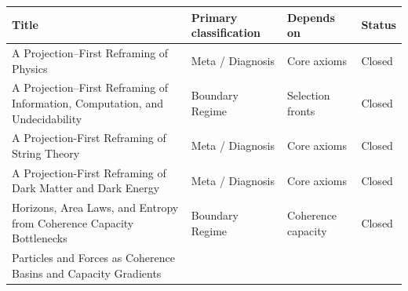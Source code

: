 \documentclass[11pt]{article}
\begin{document}
\begin{center}
\small
\begin{tabular}{|p{7.2cm}|p{3.6cm}|p{3.6cm}|p{1.6cm}|}
\hline
\textbf{Title} & \textbf{Primary classification} & \textbf{Depends on} & \textbf{Status}\\
\hline
A Projection--First Reframing of Physics
& Meta / Diagnosis & Core axioms & Closed \\
\hline
A Projection--First Reframing of Information, Computation, and Undecidability
& Boundary Regime & Selection fronts & Closed \\
\hline
A Projection-First Reframing of String Theory
& Meta / Diagnosis & Core axioms & Closed \\
\hline
A Projection-First Reframing of Dark Matter and Dark Energy
& Meta / Diagnosis & Core axioms & Closed \\
\hline
Horizons, Area Laws, and Entropy from Coherence Capacity Bottlenecks

& Boundary Regime & Coherence capacity & Closed \\
\hline
Particles and Forces as Coherence Basins and Capacity Gradients


\end{tabular}
\end{center}
\end{document}

